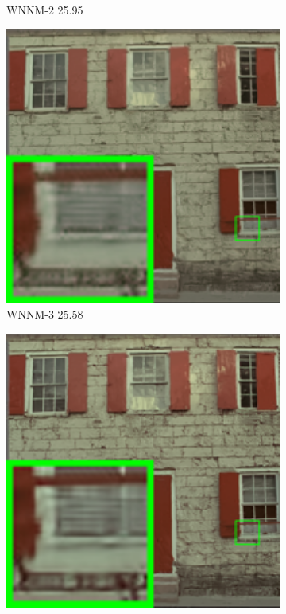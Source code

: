 \begin{figure}
\begin{subfigure}[t]{0.19\textwidth}
		\caption{WNNM-2 25.95}
    \end{subfigure}
    \hfill
    \begin{subfigure}[t]{0.19\textwidth}
        \centering
        \includegraphics[width=1\textwidth]{images/mcwnnm/24images/resize_br_WNNM_ADMM_nSig402030_kodim01.png}
		\caption{WNNM-3 25.58}
    \end{subfigure}
    \hfill
    \begin{subfigure}[t]{0.19\textwidth}
        \centering
        \includegraphics[width=1\textwidth]{images/mcwnnm/24images/resize_br_CWNNM_ADMM_nSig402030_kodim01.png}

\end{subfigure}
\end{figure}
